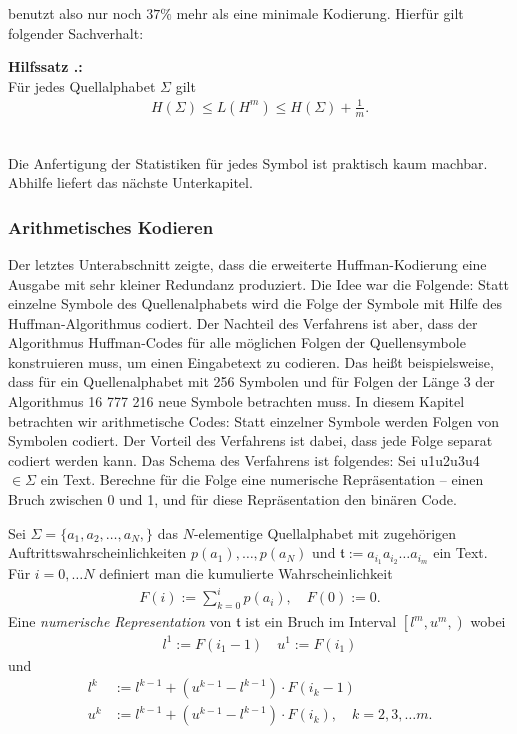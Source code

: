 \documentclass[a4paper,12pt]{article}
\newcounter{Hilfssatz}
\newcounter{Algorithmus}
\newenvironment{Hilfssatz}{
\medskip
        
        \setlength{\parindent}{0pt}
        \addtocounter{Hilfssatz}{1}
        \textbf{\textsf{Hilfssatz \thesubsection.\theHilfssatz}:}\\}{
        \nopagebreak
        \vspace{-1.0ex}
        \bigskip\\
        
}
\begin{document}
benutzt also nur noch $37\%$ mehr als eine minimale Kodierung.
Hierfür gilt folgender Sachverhalt:
\begin{Hilfssatz}
Für jedes Quellalphabet $\Sigma$ gilt
\begin{align*}
H(\Sigma)\leq L(H^m) \leq H(\Sigma) + \frac{1}{m}.
\end{align*}
\end{Hilfssatz}
Die Anfertigung der Statistiken für jedes Symbol ist praktisch kaum machbar. Abhilfe liefert das nächste Unterkapitel.
\subsubsection{Arithmetisches Kodieren}
Der letztes Unterabschnitt zeigte, dass die erweiterte Huffman-Kodierung eine Ausgabe mit sehr kleiner Redundanz produziert. Die Idee war die Folgende: Statt einzelne Symbole des Quellenalphabets wird die Folge der Symbole mit Hilfe des Huffman-Algorithmus codiert. Der Nachteil des Verfahrens ist aber, dass der Algorithmus Huffman-Codes für alle möglichen Folgen der Quellensymbole konstruieren muss, um einen Eingabetext zu codieren. Das heißt beispielsweise, dass für ein Quellenalphabet mit 256 Symbolen und für Folgen der Länge 3 der Algorithmus 16 777 216 neue Symbole betrachten muss. In diesem Kapitel betrachten wir  arithmetische Codes: Statt einzelner Symbole werden Folgen von Symbolen codiert. Der Vorteil des Verfahrens ist dabei, dass jede Folge separat codiert werden kann. Das Schema des Verfahrens ist folgendes: Sei u1u2u3u4 $\in\Sigma$ ein Text. Berechne für die Folge eine numerische Repräsentation – einen Bruch zwischen 0 und 1, und für diese Repräsentation den binären Code. 
\par
Sei $\Sigma = \{a_{1},a_{2},\ldots,a_{N},\}$ das $N$-elementige Quellalphabet mit zugehörigen Auftrittswahrscheinlichkeiten $p(a_1),\ldots , p(a_N)$ und $\mathfrak{t}:=a_{i_1}a_{i_2}\ldots a_{i_m}$ ein Text. Für $i=0,\ldots N$ definiert man die kumulierte Wahrscheinlichkeit
\begin{align*}
F(i):=\sum_{k=0}^{i}p(a_i),\quad F(0):=0.
\end{align*}
Eine {\it numerische Representation} von $\mathfrak{t}$ ist ein Bruch im Interval $\left.\left[l^{m} ,  u^{m},\right.\right)$ wobei
\begin{align*}
l^{1}:=F(i_1 -1)\quad u^1:=F(i_1)
\end{align*}
und
\begin{align*}
l^{k}&:=l^{k-1} + \left( u^{k-1} - l^{k-1}\right) \cdot F(i_{k} - 1)
\\
u^{k}&:=l^{k-1} + \left( u^{k-1} - l^{k-1}\right) \cdot F(i_{k}),\quad k=2,3,\ldots m.
\end{align*}
\end{document}
